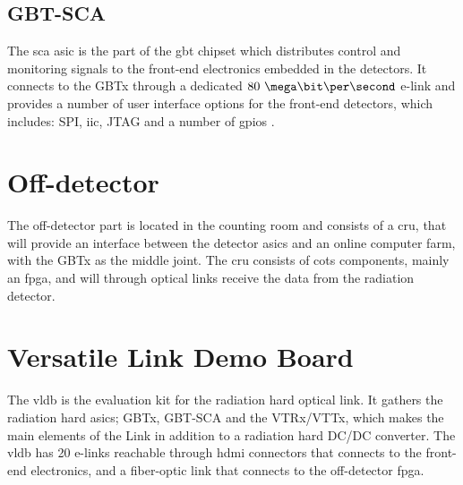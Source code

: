 \documentclass[main.tex]{subfiles}
\begin{document}
\subsection{GBT-SCA}

The \gls{sca} \gls{asic} is the part of the \gls{gbt} chipset which distributes control and monitoring signals to the front-end electronics embedded in the detectors. It connects to the GBTx through a dedicated $80~\mega\bit\per\second$ e-link and provides a number of user interface options for the front-end detectors, which includes: SPI, \gls{iic}, JTAG and a number of \acrshort{gpio}s \cite{gbtsca15}. 

\section{Off-detector}
The off-detector part is located in the counting room and consists of a \gls{cru}, that will provide an interface between the detector \acrshort{asic}s and an online computer farm, with the GBTx as the middle joint. The \gls{cru} consists of \gls{cots} components, mainly an \gls{fpga}, and will through optical links receive the data from the radiation detector. \\

\section{Versatile Link Demo Board}

The \gls{vldb} is the evaluation kit for the radiation hard optical link. It gathers the radiation hard \glspl{asic}; GBTx, GBT-SCA and the VTRx/VTTx, which makes the main elements of the Link in addition to a radiation hard DC/DC converter. The \gls{vldb} has 20 e-links reachable through \gls{hdmi} connectors that connects to the front-end electronics, and a fiber-optic link that connects to the off-detector \gls{fpga}.
\end{document}
